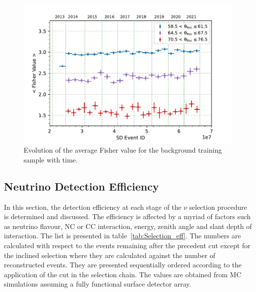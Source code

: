 
\FloatBarrier

\begin{figure}[hp!]
  \centering
  \includegraphics[width=\textwidth]{thesis_figures/Nu_analysis/Time_evol/Selection_Evo_FishVal_bkg_wnt_redcut.pdf}
  \caption{Evolution of the average Fisher value for the background training sample with time.}
  \label{fig:Fisher_evol}
\end{figure}



\subsection{Neutrino Detection Efficiency}
\label{subsec:nu_sel_nudeteff}

In this section, the detection efficiency at each stage of the $\nu$ selection procedure is determined and discussed. The efficiency is affected by a myriad of factors such as neutrino flavour, NC or CC interaction, energy, zenith angle and slant depth of interaction. The list is presented in table~\ref{tab:Selection_eff}. The numbers are calculated with respect to the events remaining after the precedent cut except for the inclined selection where they are calculated against the number of reconstructed events. They are presented sequentially ordered according to the application of the cut in the selection chain. The values are obtained from MC simulations assuming a fully functional surface detector array. 

